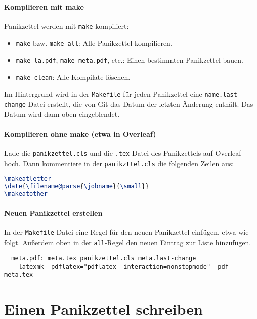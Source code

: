 \documentclass{panikzettel}
\begin{document}
\paragraph{Kompilieren mit make}

Panikzettel werden mit \texttt{make} kompiliert:
\begin{itemize}
  \item \texttt{make} bzw. \texttt{make all}: Alle Panikzettel kompilieren.
  \item \texttt{make la.pdf}, \texttt{make meta.pdf}, etc.: Einen bestimmten Panikzettel bauen.
  \item \texttt{make clean}: Alle Kompilate löschen.
\end{itemize}

{\small{}
  Im Hintergrund wird in der \texttt{Makefile} für jeden Panikzettel eine \texttt{name.last-change} Datei erstellt, die von Git das Datum der letzten Änderung enthält.
  Das Datum wird dann oben eingeblendet.
}

\paragraph{Kompilieren ohne make (etwa in Overleaf)}

Lade die \texttt{panikzettel.cls} und die \texttt{.tex}-Datei des Panikzettels auf Overleaf hoch.
Dann kommentiere in der \texttt{panikzttel.cls} die folgenden Zeilen aus:
\begin{lstlisting}[language=tex]
% Show most recent revision number and date in date field
\makeatletter
\date{\filename@parse{\jobname}{\small}}
\makeatother
\end{lstlisting}

\paragraph{Neuen Panikzettel erstellen}

In der \texttt{Makefile}-Datei eine Regel für den neuen Panikzettel einfügen, etwa wie folgt.
Außerdem oben in der \texttt{all}-Regel den neuen Eintrag zur Liste hinzufügen.
\begin{lstlisting}
  meta.pdf: meta.tex panikzettel.cls meta.last-change
	latexmk -pdflatex="pdflatex -interaction=nonstopmode" -pdf meta.tex
\end{lstlisting}

\section{Einen Panikzettel schreiben}
\end{document}
